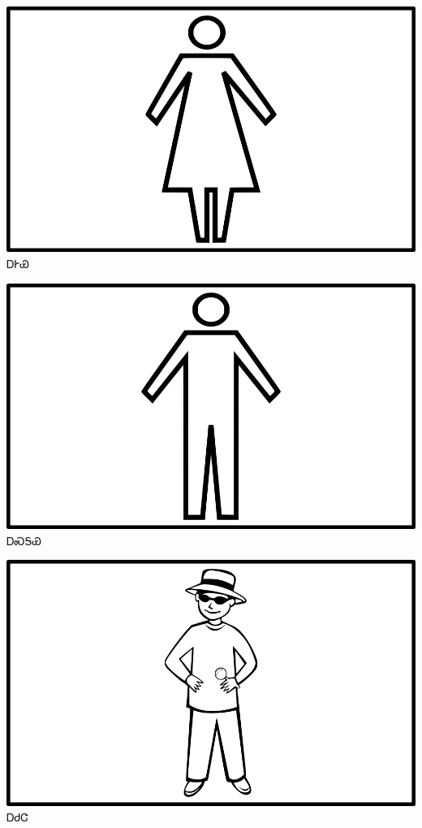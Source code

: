 \documentclass[avery5371]{flashcards}%
\begin{document}
    \begin{flashcard}{
        \includegraphics[width=0.95\columnwidth,height=.51\columnwidth,keepaspectratio]{../artwork/objects-animate/agehya}
    }
        \Huge ᎠᎨᏯ
    \end{flashcard}

    \begin{flashcard}{
        \includegraphics[width=0.95\columnwidth,height=.51\columnwidth,keepaspectratio]{../artwork/objects-animate/asgaya}
    }
        \Huge ᎠᏍᎦᏯ
    \end{flashcard}

    \begin{flashcard}{
        \includegraphics[width=0.95\columnwidth,height=.51\columnwidth,keepaspectratio]{../artwork/objects-animate/achuja}
    }
        \Huge ᎠᏧᏣ
    \end{flashcard}
\end{document}

